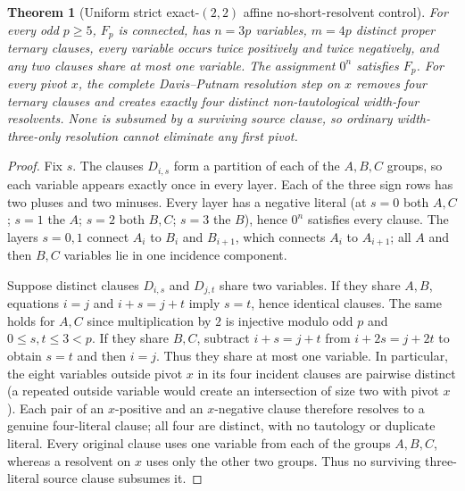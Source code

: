 \documentclass[11pt]{article}
\newtheorem{theorem}{Theorem}
\begin{document}
\begin{theorem}[Uniform strict exact-$(2,2)$ affine no-short-resolvent control]
For every odd $p\ge5$, $F_p$ is connected, has $n=3p$ variables, $m=4p$ distinct proper ternary clauses, every variable occurs twice positively and twice negatively, and any two clauses share at most one variable. The assignment $0^n$ satisfies $F_p$. For \emph{every} pivot $x$, the complete Davis--Putnam resolution step on $x$ removes four ternary clauses and creates exactly four \emph{distinct non-tautological width-four} resolvents. None is subsumed by a surviving source clause, so ordinary width-three-only resolution cannot eliminate any first pivot.
\end{theorem}
\begin{proof}
Fix $s$. The clauses $D_{i,s}$ form a partition of each of the $A,B,C$ groups, so each variable appears exactly once in every layer. Each of the three sign rows has two pluses and two minuses. Every layer has a negative literal (at $s=0$ both $A,C$; $s=1$ the $A$; $s=2$ both $B,C$; $s=3$ the $B$), hence $0^n$ satisfies every clause. The layers $s=0,1$ connect $A_i$ to $B_i$ and $B_{i+1}$, which connects $A_i$ to $A_{i+1}$; all $A$ and then $B,C$ variables lie in one incidence component.

Suppose distinct clauses $D_{i,s}$ and $D_{j,t}$ share two variables. If they share $A,B$, equations $i=j$ and $i+s=j+t$ imply $s=t$, hence identical clauses. The same holds for $A,C$ since multiplication by $2$ is injective modulo odd $p$ and $0\le s,t\le3<p$. If they share $B,C$, subtract $i+s=j+t$ from $i+2s=j+2t$ to obtain $s=t$ and then $i=j$. Thus they share at most one variable. In particular, the eight variables outside pivot $x$ in its four incident clauses are pairwise distinct (a repeated outside variable would create an intersection of size two with pivot $x$). Each pair of an $x$-positive and an $x$-negative clause therefore resolves to a genuine four-literal clause; all four are distinct, with no tautology or duplicate literal. Every original clause uses one variable from each of the groups $A,B,C$, whereas a resolvent on $x$ uses only the other two groups. Thus no surviving three-literal source clause subsumes it.
\end{proof}
\end{document}
